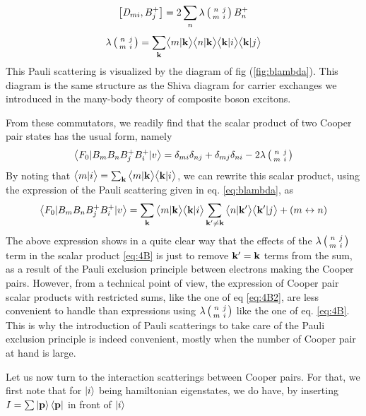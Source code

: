 \documentclass[aps,pra,amsmath,amssymb,preprint,groupedaddress]{revtex4}
\begin{document}
\begin{equation}
\left[\mathit{D}_{mi},B^+_j\right]=2\sum_{n}\lambda\left(\begin{smallmatrix}n&j\\m&i\end{smallmatrix}\right)B^+_{n}
\end{equation}
\begin{equation}\label{eq:blambda}
\lambda\left(\begin{smallmatrix}n&j\\m&i\end{smallmatrix}\right)=\sum_{\mathbf{k}}\bigl<{{m}|{\mathbf{k}}}\bigr>\bigl<{{n}|{\mathbf{k}}}\bigr>\bigl<{{\mathbf{k}}|{i}}\bigr>\bigl<{{\mathbf{k}}|{j}}\bigr>
\end{equation}
This Pauli scattering is visualized by the diagram of fig (\ref{fig:blambda}). This diagram is the same structure as the Shiva diagram for carrier exchanges we introduced in the many-body theory of composite boson excitons. 

From these commutators, we readily find that the scalar product of two Cooper pair states has the usual form, namely
\begin{equation}\label{eq:4B}
\bigl<{F_0\lvert{B_mB_nB^+_jB^+_i}\rvert v}\bigr>=\delta_{mi}\delta_{nj}+\delta_{mj}\delta_{ni}-2\lambda\left(\begin{smallmatrix}n&j\\m&i\end{smallmatrix}\right)
\end{equation}
By noting that $\bigl<{{m}|{i}}\bigr>=\sum_{\mathbf{k}}{\bigl<{{m}|{\mathbf{k}}}\bigr>\bigl<{{\mathbf{k}}|{i}}\bigr>}$, we can rewrite this scalar product, using the expression of the Pauli scattering given in eq. \eqref{eq:blambda}, as 
\begin{equation}\label{eq:4B2}
\bigl<{F_0\lvert{B_mB_nB^+_jB^+_i}\rvert v}\bigr>=\sum_{\mathbf{k}}{\bigl<{{m}|{\mathbf{k}}}\bigr>\bigl<{{\mathbf{k}}|{i}}\bigr>}\sum_{\mathbf{k}'\neq\mathbf{k}}{\bigl<{{n}|{\mathbf{k}'}}\bigr>\bigl<{{\mathbf{k}'}|{j}}\bigr>}+\left(m\leftrightarrow{n}\right)
\end{equation}
The above expression shows in a quite clear way that the effects of the $\lambda\left(\begin{smallmatrix}n&j\\m&i\end{smallmatrix}\right)$ term in the scalar product \eqref{eq:4B} is just to remove $\mathbf{k}'=\mathbf{k}$ terms from the sum, as a result of the Pauli exclusion principle between electrons making the Cooper pairs. However, from a technical point of view, the expression of Cooper pair scalar products with restricted sums, like the one of eq \eqref{eq:4B2}, are less convenient to handle than expressions using $\lambda\left(\begin{smallmatrix}n&j\\m&i\end{smallmatrix}\right)$ like the one of eq. \eqref{eq:4B}.  This is why the introduction of Pauli scatterings to take care of the Pauli exclusion principle is indeed convenient, mostly when the number of Cooper pair at hand is large.

Let us now turn to the interaction scatterings between Cooper pairs. For that, we first note that for $\left|i\right>$ being hamiltonian eigenstates, we do have, by inserting $I=\sum\left|\mathbf{p}\right>\left<\mathbf{p}\right|$ in front of $\left|i\right>$
\end{document}

